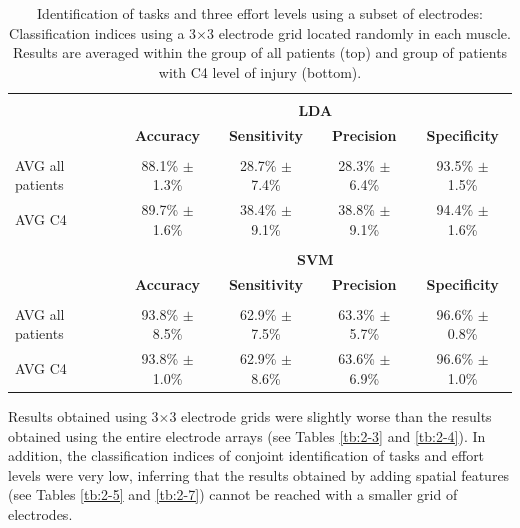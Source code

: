 \begin{table}[]
\centering
\caption{Identification of tasks and three effort levels using a subset of electrodes: Classification indices using a 3$\times$3 electrode grid located randomly in each muscle. Results are averaged within the group of all patients (top) and group of patients with C4 level of injury (bottom).}
\label{tb:2-10}
\begin{tabular}{lcccc}
 & & & &\\
                 & \multicolumn{4}{c}{\large{\textbf{LDA}}}                                                      \\
                 & \textbf{Accuracy}  & \textbf{Sensitivity} & \textbf{Precision} & \textbf{Specificity} \\ \hline
                 &                    &                      &                    &                      \\
AVG all patients & 88.1\% $\pm$ 1.3\% & 28.7\% $\pm$ 7.4\% & 28.3\% $\pm$ 6.4\% & 93.5\% $\pm$ 1.5\% \\
AVG C4           & 89.7\% $\pm$ 1.6\% & 38.4\% $\pm$ 9.1\% & 38.8\% $\pm$ 9.1\% & 94.4\% $\pm$ 1.6\% \\
                 &                    &                      &                    &                      \\
                 & \multicolumn{4}{c}{\large{\textbf{SVM}}}                                                      \\
                 & \textbf{Accuracy}  & \textbf{Sensitivity} & \textbf{Precision} & \textbf{Specificity} \\ \hline
                 &                    &                      &                    &                      \\
AVG all patients & 93.8\% $\pm$ 8.5\% & 62.9\% $\pm$ 7.5\% & 63.3\% $\pm$ 5.7\% & 96.6\% $\pm$ 0.8\% \\
AVG C4           & 93.8\% $\pm$ 1.0\% & 62.9\% $\pm$ 8.6\% & 63.6\% $\pm$ 6.9\% & 96.6\% $\pm$ 1.0\%
\end{tabular}
\end{table}

Results obtained using 3$\times$3 electrode grids were slightly worse than the results obtained using the entire electrode arrays (see Tables \ref{tb:2-3} and \ref{tb:2-4}). In addition, the classification indices of conjoint identification of tasks and effort levels were very low, inferring that the results obtained by adding spatial features (see Tables \ref{tb:2-5} and \ref{tb:2-7}) cannot be reached with a smaller grid of electrodes.


